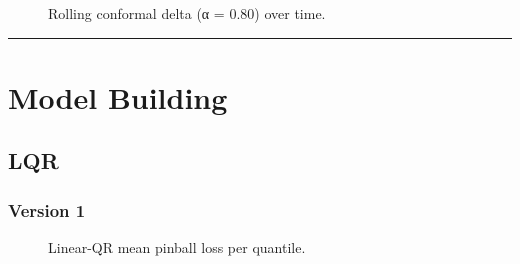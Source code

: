 \documentclass[
  a4paper,
  DIV=11,
  numbers=noendperiod]{scrreprt}
\begin{document}
\begin{figure}


\caption{\label{fig-cqr-delta}Rolling conformal delta (α = 0.80) over
time.}

\end{figure}%

\begin{center}\rule{0.5\linewidth}{0.5pt}\end{center}

\section{Model Building}\label{model-building-1}

\subsection{LQR}\label{lqr}

\subsubsection{Version 1}\label{version-1}

\begin{figure}


\caption{\label{fig-lqr-pinball-mean}Linear-QR mean pinball loss per
quantile.}

\end{figure}%
\end{document}
